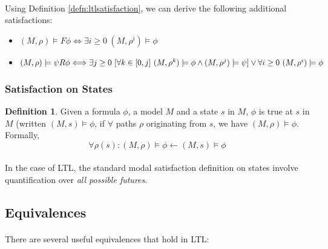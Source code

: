 \documentclass{article}
\theoremstyle{plain}
\theoremstyle{definition}
\newtheorem{defn}[thm]{Definition} %
\begin{document}
\begin{multicols}{2}
\paragraph{} Using Definition \ref{defn:ltlsatisfaction}, we can derive the following additional satisfactions:

\begin{itemize}
\item $(M, \rho) \models F\phi \Longleftrightarrow \exists i \geq 0\ (M, \rho^i) \models \phi$
\item $(M, \rho) \models \psi R\phi \Longleftrightarrow\\ \exists j \geq 0\ \lbrack \forall k \in [0, j]\ (M, \rho^k) \models \phi \land (M, \rho^j) \models \psi\rbrack\\ \lor \forall i \geq 0\ (M, \rho^i) \models \phi$
\end{itemize}

\subsubsection{Satisfaction on States}
\begin{defn}
Given a formula $\phi$, a model $M$ and a state $s$ in $M$, $\phi$ is true at $s$ in $M$ (written $(M, s) \models \phi$, if $\forall$ paths $\rho$ originating from $s$, we have $(M, \rho) \models \phi$. Formally, $$\forall \rho(s): (M, \rho) \models \phi \leftarrow (M, s) \models \phi$$
\end{defn}

\paragraph{} In the case of LTL, the standard modal satisfaction definition on states involve quantification over \textit{all possible futures}.

\subsection{Equivalences}

\paragraph{} There are several useful equivalences that hold in LTL:


\end{multicols}
\end{document}

